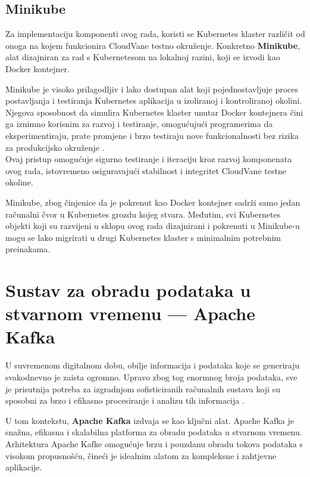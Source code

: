 \documentclass[times, utf8, diplomski]{fer}
\begin{document}
\clearpage
\subsection{Minikube}
\label{sec:minikube}

Za implementaciju komponenti ovog rada, koristi se Kubernetes klaster različit od onoga na kojem funkcionira CloudVane testno okruženje. Konkretno \textbf{Minikube}, alat dizajniran za rad s Kubernetesom na lokalnoj razini, koji se izvodi kao Docker kontejner.

Minikube je visoko prilagodljiv i lako dostupan alat koji pojednostavljuje proces postavljanja i testiranja Kubernetes aplikacija u izoliranoj i kontroliranoj okolini. Njegova sposobnost da simulira Kubernetes klaster unutar Docker kontejnera čini ga iznimno korisnim za razvoj i testiranje, omogućujući programerima da eksperimentiraju, prate promjene i brzo testiraju nove funkcionalnosti bez rizika za produkcijsko okruženje \citep{luksa_kubernetes_2023}. \\

Ovaj pristup omogućuje sigurno testiranje i iteraciju kroz razvoj komponenata ovog rada, istovremeno osiguravajući stabilnost i integritet CloudVane testne okoline. 

Minikube, zbog činjenice da je pokrenut kao Docker kontejner sadrži samo jedan računalni čvor u Kubernetes grozdu kojeg stvara. Međutim, svi Kubernetes objekti koji su razvijeni u sklopu ovog rada dizajnirani i pokrenuti u Minikube-u mogu se lako migrirati u drugi Kubernetes klaster s minimalnim potrebnim preinakama.

\clearpage
\section{Sustav za obradu podataka u stvarnom vremenu --- Apache Kafka}
\label{sec:kafka}

U suvremenom digitalnom dobu, obilje informacija i podataka koje se generiraju svakodnevno je zaista ogromno. Upravo zbog tog enormnog broja podataka, sve je prisutnija potreba za izgradnjom sofisticiranih računalnih sustava koji su sposobni za brzo i efikasno procesiranje i analizu tih informacija \citep{cubek_apache_2022}.

U tom kontekstu, \textbf{Apache Kafka} izdvaja se kao ključni alat. Apache Kafka je snažna, efikasna i skalabilna platforma za obradu podataka u stvarnom vremenu. Arhitektura Apache Kafke omogućuje brzu i pouzdanu obradu tokova podataka s visokom propusnošću, čineći je idealnim alatom za kompleksne i zahtjevne aplikacije. 
\end{document}
